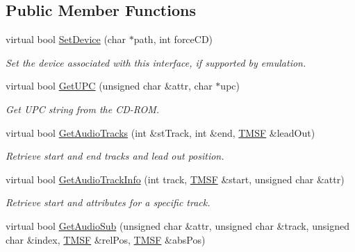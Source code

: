 \subsection*{Public Member Functions}
\begin{DoxyCompactItemize}
\item 
\hypertarget{classCDROM__Interface__SDL_ac2830ccd403b203edadd17f2b69525d3}{virtual bool \hyperlink{classCDROM__Interface__SDL_ac2830ccd403b203edadd17f2b69525d3}{Set\-Device} (char $\ast$path, int force\-C\-D)}\label{classCDROM__Interface__SDL_ac2830ccd403b203edadd17f2b69525d3}

\begin{DoxyCompactList}\small\item\em Set the device associated with this interface, if supported by emulation. \end{DoxyCompactList}\item 
\hypertarget{classCDROM__Interface__SDL_a71ac58fc052e29d96e79ef6234e6abbb}{virtual bool \hyperlink{classCDROM__Interface__SDL_a71ac58fc052e29d96e79ef6234e6abbb}{Get\-U\-P\-C} (unsigned char \&attr, char $\ast$upc)}\label{classCDROM__Interface__SDL_a71ac58fc052e29d96e79ef6234e6abbb}

\begin{DoxyCompactList}\small\item\em Get U\-P\-C string from the C\-D-\/\-R\-O\-M. \end{DoxyCompactList}\item 
\hypertarget{classCDROM__Interface__SDL_a80e68ad21338f4ccc44361cbc079e67d}{virtual bool \hyperlink{classCDROM__Interface__SDL_a80e68ad21338f4ccc44361cbc079e67d}{Get\-Audio\-Tracks} (int \&st\-Track, int \&end, \hyperlink{structSMSF}{T\-M\-S\-F} \&lead\-Out)}\label{classCDROM__Interface__SDL_a80e68ad21338f4ccc44361cbc079e67d}

\begin{DoxyCompactList}\small\item\em Retrieve start and end tracks and lead out position. \end{DoxyCompactList}\item 
\hypertarget{classCDROM__Interface__SDL_a8153067b1065412fc0c1b0de4afa58d8}{virtual bool \hyperlink{classCDROM__Interface__SDL_a8153067b1065412fc0c1b0de4afa58d8}{Get\-Audio\-Track\-Info} (int track, \hyperlink{structSMSF}{T\-M\-S\-F} \&start, unsigned char \&attr)}\label{classCDROM__Interface__SDL_a8153067b1065412fc0c1b0de4afa58d8}

\begin{DoxyCompactList}\small\item\em Retrieve start and attributes for a specific track. \end{DoxyCompactList}\item 
\hypertarget{classCDROM__Interface__SDL_a528bc5b106e883ab19a5b23d67f5b89a}{virtual bool \hyperlink{classCDROM__Interface__SDL_a528bc5b106e883ab19a5b23d67f5b89a}{Get\-Audio\-Sub} (unsigned char \&attr, unsigned char \&track, unsigned char \&index, \hyperlink{structSMSF}{T\-M\-S\-F} \&rel\-Pos, \hyperlink{structSMSF}{T\-M\-S\-F} \&abs\-Pos)}\label{classCDROM__Interface__SDL_a528bc5b106e883ab19a5b23d67f5b89a}


\end{DoxyCompactItemize}
